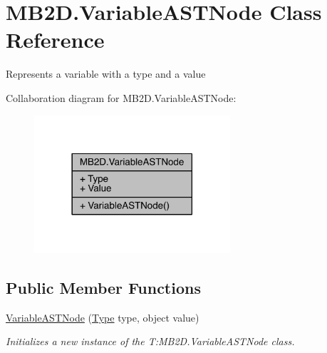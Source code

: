 \hypertarget{class_m_b2_d_1_1_variable_a_s_t_node}{}\section{M\+B2\+D.\+Variable\+A\+S\+T\+Node Class Reference}
\label{class_m_b2_d_1_1_variable_a_s_t_node}


Represents a variable with a type and a value  




Collaboration diagram for M\+B2\+D.\+Variable\+A\+S\+T\+Node\+:
\nopagebreak
\begin{figure}[H]
\begin{center}
\leavevmode
\includegraphics[width=206pt]{class_m_b2_d_1_1_variable_a_s_t_node__coll__graph}
\end{center}
\end{figure}
\subsection*{Public Member Functions}
\begin{DoxyCompactItemize}
\item 
\hyperlink{class_m_b2_d_1_1_variable_a_s_t_node_a60c81f23a47577aefc76ecb9dc18d40f}{Variable\+A\+S\+T\+Node} (\hyperlink{class_m_b2_d_1_1_variable_a_s_t_node_a32549a5361b7664b945b4d9537a5b454}{Type} type, object value)
\begin{DoxyCompactList}\small\item\em Initializes a new instance of the T\+:\+M\+B2\+D.\+Variable\+A\+S\+T\+Node class. \end{DoxyCompactList}\end{DoxyCompactItemize}

